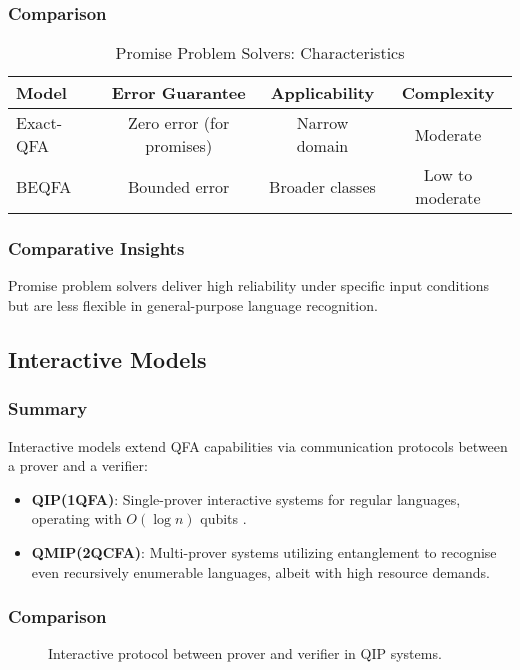 \subsubsection{Comparison}
\begin{table}[ht]
\centering
\label{tab:promise}
\begin{tabular}{|l|c|c|c|}
\hline
\textbf{Model} & \textbf{Error Guarantee} & \textbf{Applicability} & \textbf{Complexity} \\ \hline
Exact-QFA & Zero error (for promises) & Narrow domain & Moderate \\ \hline
BEQFA    & Bounded error & Broader classes & Low to moderate \\ \hline
\end{tabular}
\caption{Promise Problem Solvers: Characteristics}
\end{table}

\subsubsection{Comparative Insights}
Promise problem solvers deliver high reliability under specific input conditions but are less flexible in general-purpose language recognition.

\subsection*{Interactive Models}

\subsubsection{Summary}
Interactive models extend QFA capabilities via communication protocols between a prover and a verifier:
\begin{itemize}
    \item \textbf{QIP(1QFA)}: Single-prover interactive systems for regular languages, operating with $O(\log n)$ qubits \cite{yakaryilmaz2013verification}.
    \item \textbf{QMIP(2QCFA)}: Multi-prover systems utilizing entanglement to recognise even recursively enumerable languages, albeit with high resource demands.
\end{itemize}

\subsubsection{Comparison}
\begin{figure}[ht]
\centering
{}
\caption{Interactive protocol between prover and verifier in QIP systems.}
\label{fig:interactive}
\end{figure}

